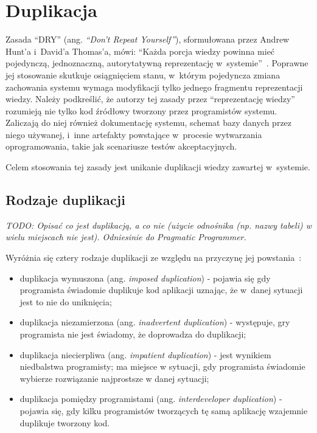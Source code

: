 \chapter{Duplikacja} \label{chap:duplication}

Zasada ``DRY'' (ang. \emph{``Don't Repeat Yourself''}), sformułowana przez Andrew Hunt'a i~David'a Thomas'a, mówi: ``Każda porcja wiedzy powinna mieć pojedynczą, jednoznaczną, autorytatywną reprezentację w~systemie''~\cite{prag:prog}.
Poprawne jej stosowanie skutkuje osiągnięciem stanu, w~którym pojedyncza zmiana zachowania systemu wymaga modyfikacji tylko jednego fragmentu reprezentacji wiedzy.
Należy podkreślić, że autorzy tej zasady przez ``reprezentację wiedzy'' rozumieją nie tylko kod źródłowy tworzony przez programistów systemu.
Zaliczają do niej również dokumentację systemu, schemat bazy danych przez niego używanej, i~inne artefakty powstające w~procesie wytwarzania oprogramowania, takie jak scenariusze testów akceptacyjnych.

Celem stosowania tej zasady jest unikanie duplikacji wiedzy zawartej w~systemie.


\section{Rodzaje duplikacji}

\emph{TODO: Opisać co jest duplikacją, a co nie (użycie odnośnika (np. nazwy tabeli) w wielu miejscach nie jest). Odniesinie do Pragmatic Programmer.}

Wyróżnia się cztery rodzaje duplikacji ze względu na przyczynę jej powstania~\cite{prag:prog}:

\begin{itemize}
 \item duplikacja wymuszona (ang. \emph{imposed duplication}) - pojawia się gdy programista świadomie duplikuje kod aplikacji uznając, że w~danej sytuacji jest to nie do uniknięcia;
 \item duplikacja niezamierzona (ang. \emph{inadvertent duplication}) - występuje, gry programista nie jest świadomy, że doprowadza do duplikacji;
 \item duplikacja niecierpliwa (ang. \emph{impatient duplication}) - jest wynikiem niedbalstwa programisty; ma miejsce w sytuacji, gdy programista świadomie wybierze rozwiązanie najprostsze w danej sytuacji;
 \item duplikacja pomiędzy programistami (ang. \emph{interdeveloper duplication}) - pojawia się, gdy kilku programistów tworzących tę samą aplikację wzajemnie duplikuje tworzony kod.
\end{itemize}

